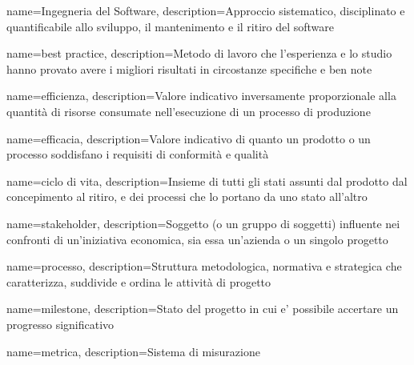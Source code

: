 {
	name={Ingegneria del Software},
	description={Approccio sistematico, disciplinato e quantificabile allo sviluppo, il mantenimento e il ritiro del software}
}

{
	name={best practice},
	description={Metodo di lavoro che l'esperienza e lo studio hanno provato avere i migliori risultati in circostanze specifiche e ben note}
}

{
	name=efficienza,
	description={Valore indicativo inversamente proporzionale alla quantità di risorse consumate nell'esecuzione di un processo di produzione}
}

{
	name=efficacia,
	description={Valore indicativo di quanto un prodotto o un processo soddisfano i requisiti di conformità e qualità}
}

{
	name={ciclo di vita},
	description={Insieme di tutti gli stati assunti dal prodotto dal concepimento al ritiro, e dei processi che lo portano da uno stato all'altro}
}

{
	name=stakeholder,
	description={Soggetto (o un gruppo di soggetti) influente nei confronti di un'iniziativa economica, sia essa un'azienda o un singolo progetto}
}

{
	name={processo},
	description={Struttura metodologica, normativa e strategica che caratterizza, suddivide e ordina le attività di progetto}
}

{
	name={milestone},
	description={Stato del progetto in cui e' possibile accertare un progresso significativo}
}

{
	name=metrica,
	description={Sistema di misurazione}
}